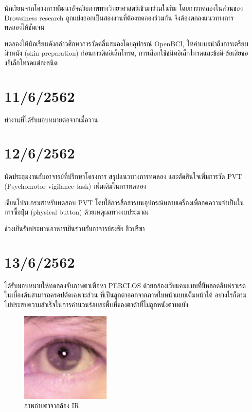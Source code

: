 นักเรียนจากโครงการพัฒนาอัจฉริยภาพทางวิทยาศาสตร์เข้ามาร่วมในทีม โดยการทดลองในส่วนของ Drowsiness research
ถูกแบ่งออกเป็นสองงานที่ต้องทดลองร่วมกัน จึงต้องตกลงแนวทางการทดลองให้ชัดเจน

ทดลองให้นักเรียนดังกล่าวศึกษาการวัดคลื่นสมองโดยอุปกรณ์ OpenBCI, ให้คำแนะนำถึงการเตรียมผิวหนัง (skin preparation)
ก่อนการติดอิเล็กโทรด, การเลือกใช้ชนิดอิเล็กโทรดและข้อดี-ข้อเสียของอิเล็กโทรดแต่ละชนิด

\section*{11/6/2562}

ทำงานที่ได้รับมอบหมายต่อจากเมื่อวาน

\section*{12/6/2562}

นัดประชุมงานกับอาจารย์ที่ปรึกษาโครงการ สรุปแนวทางการทดลอง และตัดสินใจเพิ่มการวัด PVT (Psychomotor vigilance task)
เพิ่มเติมในการทดลอง

เขียนโปรแกรมสำหรับทดสอบ PVT โดยใช้การสื่อสารบนอุปกรณ์หลายเครื่องเพื่อลดความจำเป็นในการซื้อปุ่ม (physical button)
ด้วยเหตุผลทางงบประมาณ

ช่วงเย็นรับประทานอาหารเย็นร่วมกับอาจารย์ธงชัย ชิวปรีชา

\section*{13/6/2562}

ได้รับมอบหมายให้ทดลองจับภาพตาเพื่อหา PERCLOS ด้วยกล้องเว็บแคมแบบที่มีหลอดอินฟราเรด ในเบื้องต้นสามารถครอปตัดเฉพาะส่วน
ที่เป็นลูกตาออกจากภาพใบหน้าแบบเต็มหน้าได้ อย่างไรก็ตาม ไม่ประสบความสำเร็จในการคำนวนร้อยละพื้นที่ของตาดำที่ไม่ถูกหนังตาบดบัง

\begin{figure}[H]
    \centering
    \includegraphics[width=0.4\textwidth]{images/268.png}
    \caption{ภาพถ่ายตาจากล้อง IR}
\end{figure}

